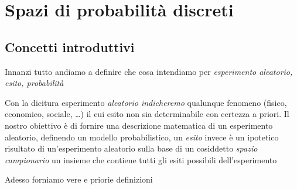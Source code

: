 \chapter{Spazi di probabilità discreti}
\section{Concetti introduttivi}
Innanzi tutto andiamo a definire che cosa intendiamo per \textit{esperimento aleatorio, esito, probabilità}

Con la dicitura esperimento \textit{aleatorio indicheremo} qualunque fenomeno (fisico, economico, sociale, \dots ) il cui esito non sia determinabile con certezza a priori. Il nostro obiettivo è di fornire una descrizione matematica di un esperimento aleatorio, definendo un modello probabilistico, un \textit{esito} invece è un ipotetico risultato di un'esperimento aleatorio sulla base di un cosiddetto \textit{spazio campionario} un insieme che contiene tutti gli esiti possibili dell’esperimento


Adesso forniamo vere e priorie definizioni
